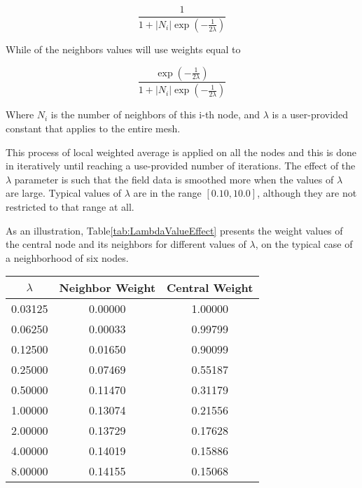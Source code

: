 \documentclass{InsightArticle}
\begin{document}
\begin{equation}
\frac{ 1 }{ 1 + \left| N_i \right|  \exp{ \left( -\frac{1}{2\lambda} \right) } }
\end{equation}

While of the neighbors values will use weights equal to

\begin{equation}
\frac{  \exp{ \left( -\frac{1}{2\lambda} \right) } }
{ 1 + \left| N_i \right| \exp{ \left( -\frac{1}{2\lambda} \right) } }
\end{equation}

Where $N_i$ is the number of neighbors of this i-th node, and $\lambda$ is a
user-provided constant that applies to the entire mesh.

This process of local weighted average is applied on all the nodes and this is
done in iteratively until reaching a use-provided number of iterations.  The
effect of the $\lambda$ parameter is such that the field data is smoothed more
when the values of $\lambda$ are large. Typical values of $\lambda$ are in the
range $[0.10,10.0]$, although they are not restricted to that range at all.

As an illustration, Table\ref{tab:LambdaValueEffect} presents the weight values
of the central node and its neighbors for different values of $\lambda$, on the
typical case of a neighborhood of six nodes.

\begin{table}
\begin{center}
\begin{tabular}{|c|c|c|}
\hline
$\lambda$ & Neighbor Weight & Central Weight \\
\hline
\hline
0.03125 & 0.00000 & 1.00000 \\
\hline
0.06250 & 0.00033 & 0.99799 \\
\hline
0.12500 & 0.01650 & 0.90099 \\
\hline
0.25000 & 0.07469 & 0.55187 \\
\hline
0.50000 & 0.11470 & 0.31179 \\
\hline
1.00000 & 0.13074 & 0.21556 \\
\hline
2.00000 & 0.13729 & 0.17628 \\
\hline
4.00000 & 0.14019 & 0.15886 \\
\hline
8.00000 & 0.14155 & 0.15068 \\
\hline
\end{tabular}
\end{center}
\end{table}
\end{document}
